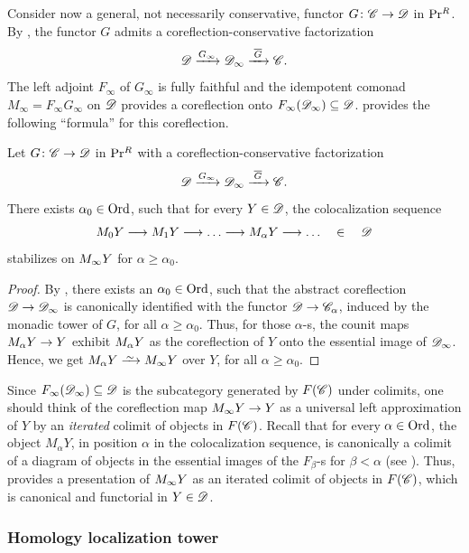 \documentclass[12pt]{article}
\begin{document}
Consider now a general, not necessarily conservative, functor $G\colon \mathscr{C} \to \mathscr{D}$ in $\mathrm{Pr}{}^R$. By , the functor $G$ admits a coreflection-conservative factorization
\[
    \mathscr{D} \xrightarrow{G_\infty} \mathscr{D}_\infty \xrightarrow{\;\overline{G}\;} \mathscr{C}.
\]
The left adjoint $F_\infty$ of $G_\infty$ is fully faithful and the idempotent comonad $M_\infty = F_\infty G_\infty$ on $\mathscr{D}$ provides a coreflection onto $F_\infty (\mathscr{D}_\infty) \subseteq \mathscr{D}$.
 provides the following ``formula'' for this coreflection.

\begin{cor}\label{Iterated_Colimit_Functorial}
    Let $G\colon \mathscr{C} \to \mathscr{D}$ in $\mathrm{Pr}{}^R$ with a coreflection-conservative factorization
    \[
        \mathscr{D} \xrightarrow{G_\infty} \mathscr{D}_\infty \xrightarrow{\;\overline{G}\;} \mathscr{C}.
    \]
    There exists $\alpha_0 \in \mathrm{Ord}$, such that for every $Y\in\mathscr{D}$, the colocalization sequence
    \[
        \comnd_0 Y \lto \comnd_1 Y \lto \dots \lto \comnd_\alpha Y \lto \dots
        \qin \cD
    \]
    stabilizes on $M_\infty Y$ for $\alpha \ge \alpha_0$.
\end{cor}
\begin{proof}
    By , there exists an $\alpha_0\in\mathrm{Ord}$, such that the abstract coreflection $\mathscr{D} \to \mathscr{D}_\infty$ is canonically identified with the functor $\mathscr{D} \to \mathscr{C}_{\alpha}$, induced by the monadic tower of $G$, for all $\alpha \ge \alpha_0$. Thus, for those $\alpha$-s, the counit maps $M_\alpha Y \to Y$ exhibit $M_\alpha Y$ as the coreflection of $Y$ onto the essential image of $\mathscr{D}_\infty$. Hence, we get $M_\alpha Y \iso M_\infty Y$ over $Y$, for all $\alpha \ge \alpha_0$.
\end{proof}

Since $F_\infty(\mathscr{D}_\infty)\subseteq \mathscr{D}$ is the subcategory generated by $F(\mathscr{C})$ under colimits, one should think of the coreflection map $M_\infty Y \to Y$ as a universal left approximation of $Y$ by an \textit{iterated} colimit of objects in $F(\mathscr{C})$.
Recall that for every $\alpha\in\mathrm{Ord}$, the object $M_\alpha Y$, in position $\alpha$ in the colocalization sequence, is canonically a colimit of a diagram of objects in the essential images of the $F_\beta$-s for $\beta < \alpha$ (see ). Thus,  provides a presentation of $M_\infty Y$ as an iterated colimit of objects in $F(\mathscr{C})$, which is canonical and functorial in $Y\in\mathscr{D}$.


\subsubsection{Homology localization tower}
\end{document}
